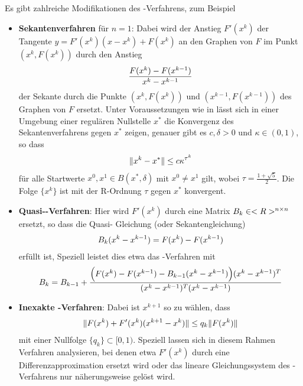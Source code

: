 \begin{remark}
	Es gibt zahlreiche Modifikationen des -Verfahrens, zum Beispiel
	\begin{itemize}
		\item\textbf{Sekantenverfahren} für $n=1$: Dabei wird der Anstieg $F'(x^k)$ der Tangente $y=F'(x^k)(x-x^k)+F(x^k)$ an den Graphen von $F$ im Punkt $(x^k,F(x^k))$ durch den Anstieg
		\begin{align}
			\frac{F(x^k) - F(x^{k-1})}{x^k-x^{k-1}}\notag
		\end{align}
		der Sekante durch die Punkte $(x^k,F(x^k))$ und $(x^{k-1},F(x^{k-1}))$ des Graphen von $F$ ersetzt. Unter Voraussetzungen wie in  lässt sich in einer Umgebung einer regulären Nullstelle $x^\ast$ die Konvergenz des Sekantenverfahrens gegen $x^\ast$ zeigen, genauer gibt es $c,\delta>0$ und $\kappa\in (0,1)$, so dass
		\begin{align}
			\Vert x^k-x^\ast\Vert \le c\kappa^{\tau^k}\notag
		\end{align}
		für alle Startwerte $x^0,x^1\in B(x^\ast,\delta)$ mit $x^0\neq x^1$ gilt, wobei $\tau = \frac{1+\sqrt{5}}{2}$. Die Folge $\{x^k\}$ ist mit der R-Ordnung $\tau$ gegen $x^\ast$ konvergent.
		\item\textbf{Quasi--Verfahren}: Hier wird $F'(x^k)$ durch eine Matrix $B_k\in<R>^{n\times n}$ ersetzt, so dass die Quasi- Gleichung (oder Sekantengleichung)
		\begin{align}
			B_k(x^k-x^{k-1}) = F(x^k) - F(x^{k-1})\notag
		\end{align}
		erfüllt ist, Speziell leistet dies etwa das -Verfahren mit
		\begin{align}
			B_k= B_{k-1} + \frac{\Big(F(x^k) - F(x^{k-1}) - B_{k-1}(x^k - x^{k-1})\Big)(x^k - x^{k-1})^T}{(x^k - x^{k-1})^T(x^k - x^{k-1})} \notag
		\end{align}
		\item\textbf{Inexakte -Verfahren}: Dabei ist $x^{k+1}$ so zu wählen, dass
		\begin{align}
			\Vert F(x^k) + F'(x^k)(x^{k+1}-x^k)\Vert\le q_k\Vert F(x^k)\Vert\notag
		\end{align}
		mit einer Nullfolge $\{q_k\}\subset[0,1)$. Speziell lassen sich in diesem Rahmen Verfahren analysieren, bei denen etwa $F'(x ^k)$ durch eine Differenzapproximation ersetzt wird oder das lineare Gleichungssystem des -Verfahrens nur näherungsweise gelöst wird.
	\end{itemize}
\end{remark}